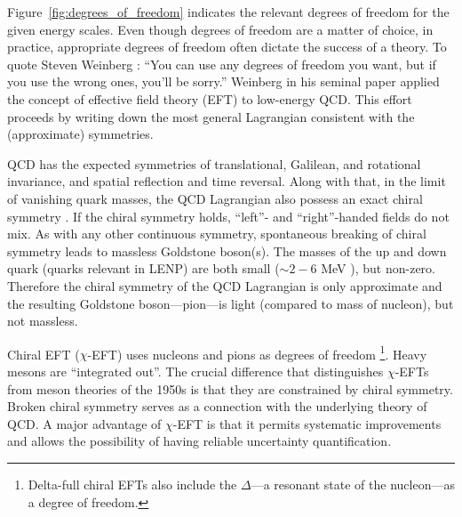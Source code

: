 	Figure~\ref{fig:degrees_of_freedom} indicates the relevant degrees of freedom
	for the given energy scales.  Even though degrees of freedom are a matter of
	choice, in practice, appropriate degrees of freedom often dictate the
	success of a theory.  To quote Steven Weinberg \cite{Guth:1984rq}:
	``You can use any degrees of freedom you want, but if you use the wrong ones,
	you'll be sorry.''
	Weinberg in his seminal paper \cite{Weinberg:1978kz} applied the concept
	of effective field theory (EFT) to low-energy QCD.  This effort
	proceeds by writing down the most general Lagrangian consistent with the
	(approximate) symmetries.

	QCD has the expected symmetries of translational, Galilean, and rotational
	invariance, and spatial reflection and time reversal.  Along with that,
	in the limit of vanishing quark masses, the QCD Lagrangian also possess an
	exact	chiral symmetry \cite{Peskin1995a}.  If the chiral symmetry holds,
	``left''- and
	``right''-handed fields do not mix.  As with any other continuous symmetry,
	spontaneous breaking of chiral symmetry leads to massless Goldstone boson(s).
	The masses of the up and down quark (quarks relevant in LENP) are both small
	($\sim 2 - 6$ MeV \cite{Agashe:2014kda}), but non-zero.  Therefore the
	chiral symmetry of the QCD Lagrangian is only approximate and the resulting
	Goldstone boson---pion---is light (compared to mass of nucleon), but not
	massless.

	Chiral EFT ($\chi$-EFT) uses nucleons and pions as degrees of freedom
	\footnote{Delta-full chiral EFTs also include the
	$\Delta$---a resonant state of the nucleon---as a degree of freedom. }.
	Heavy mesons are
	``integrated out''.  The crucial difference that distinguishes $\chi$-EFTs from
	meson theories of the 1950s is that they are constrained by chiral symmetry.
	Broken chiral symmetry serves as a connection with the underlying theory of
	QCD.
	A major advantage of $\chi$-EFT is that it permits systematic improvements
	and allows the possibility of having reliable uncertainty quantification.


